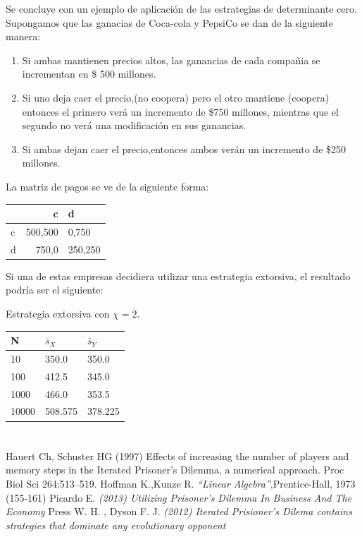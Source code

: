 \documentclass[11pt]{article}
\begin{document}
Se concluye con un ejemplo de aplicación de las estrategias de determinante cero.
Supongamos que las ganacias de Coca-cola y PepsiCo se dan de la siguiente manera:
\begin{enumerate}
 \item Si ambas mantienen precios altos, las ganancias de cada compañia se incrementan
 en \$ 500 millones. 
 \item Si uno deja caer el precio,(no coopera) pero el otro mantiene (coopera) entonces 
 el primero verá un incremento de \$750 millones, mientras que el segundo no verá una modificación en sus ganancias.
 \item Si ambas dejan caer el precio,entonces ambos verán un incremento de \$250 millones.
\end{enumerate}
 
La matriz de pagos se ve de la siguiente forma:

\begin{tabular}{|l|r| l|}
  \hline   
     & c & d \\\hline
   c & 500,500 & 0,750 \\ \hline
   d & 750,0 & 250,250 \\  \hline  
\end{tabular} 

Si una de estas empresas decidiera utilizar una estrategia extorsiva, el resultado podría ser el
siguiente:

Estrategia extorsiva con $\chi=2$. 
\begin{center}
  \begin{tabular}{| l | l | l |}
    \hline
    N & $\overline s_X$ & $\overline s_Y$ \\\hline
    10 & 350.0 &350.0 \\\hline
    100 & 412.5 & 345.0 \\\hline
    1000 & 466.0 & 353.5 \\\hline
    10000 & 508.575 & 378.225 \\\hline    
  \end{tabular}
\end{center}




\newpage
 \section{}
  \begin{thebibliography}{1}
   Hauert Ch, Schuster HG (1997) Effects of increasing the number of players and memory steps in the Iterated Prisoner’s Dilemma, a numerical approach. Proc Biol Sci 264:513–519.
    Hoffman K.,Kunze R.  \emph{``Linear Algebra''},Prentice-Hall, 1973 (155-161)
    Picardo E. {\em (2013) Utilizing Prisoner’s Dilemma In Business And The Economy }
    Press W. H. , Dyson F. J.  {\em (2012) Iterated Prisioner's Dilema contains strategies that dominate any evolutionary opponent}  
  \end{thebibliography}
\end{document}
